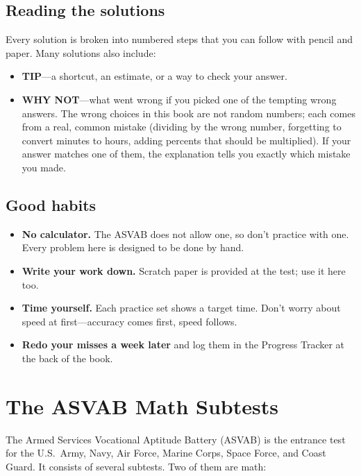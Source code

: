\section*{Reading the solutions}
Every solution is broken into numbered steps that you can follow with pencil
and paper. Many solutions also include:
\begin{itemize}
\item \textbf{TIP}---a shortcut, an estimate, or a way to check your answer.
\item \textbf{WHY NOT}---what went wrong if you picked one of the tempting
  wrong answers. The wrong choices in this book are not random numbers; each
  comes from a real, common mistake (dividing by the wrong number, forgetting
  to convert minutes to hours, adding percents that should be multiplied).
  If your answer matches one of them, the explanation tells you exactly which
  mistake you made.
\end{itemize}

\section*{Good habits}
\begin{itemize}
\item \textbf{No calculator.} The ASVAB does not allow one, so don't practice
  with one. Every problem here is designed to be done by hand.
\item \textbf{Write your work down.} Scratch paper is provided at the test;
  use it here too.
\item \textbf{Time yourself.} Each practice set shows a target time. Don't
  worry about speed at first---accuracy comes first, speed follows.
\item \textbf{Redo your misses a week later} and log them in the Progress
  Tracker at the back of the book.
\end{itemize}

\chapter*{The ASVAB Math Subtests}

The Armed Services Vocational Aptitude Battery (ASVAB) is the entrance test
for the U.S.\ Army, Navy, Air Force, Marine Corps, Space Force, and Coast Guard.
It consists of several subtests. Two of them are math:

